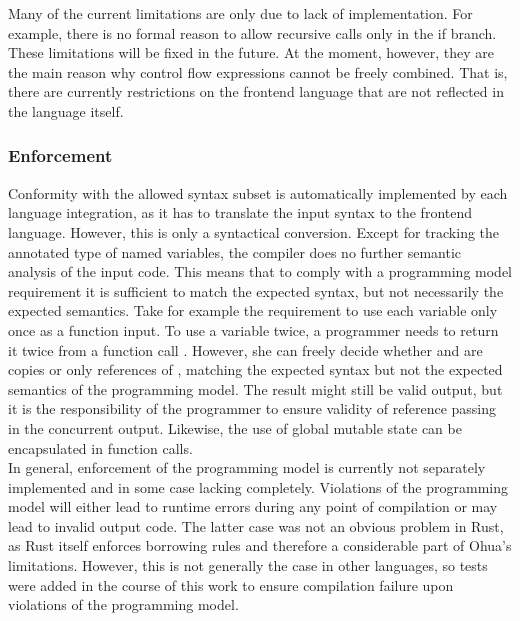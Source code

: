 Many of the current limitations are only due to lack of implementation. For example, there is no formal reason to allow recursive calls only in the if branch. These limitations will be fixed in the future. At the moment, however, they are the main reason why control flow expressions cannot be freely combined. That is, there are currently restrictions on the frontend language that are not reflected in the language itself.


\subsubsection{Enforcement}

Conformity with the allowed syntax subset is automatically implemented by each language integration, as it has to translate the input syntax to the frontend language. However, this is only a syntactical conversion. Except for tracking the annotated type of named variables, the compiler does no further semantic analysis of the input code. This means that to comply with a programming model requirement it is sufficient to match the expected syntax, but not necessarily the expected semantics. Take for example the requirement to use each variable only once as a function input. To use a variable  twice, a programmer needs to return it twice from a function call . However, she can freely decide whether  and  are copies or only references of , matching the expected syntax but not the expected semantics of the programming model. The result might still be valid output, but it is the responsibility of the programmer to ensure validity of reference passing in the concurrent output. Likewise, the use of global mutable state can be encapsulated in function calls. \\

In general, enforcement of the programming model is currently not separately implemented and in some case lacking completely. Violations of the programming model will either lead to runtime errors during any point of compilation or may lead to invalid output code. The latter case was not an obvious problem in Rust, as Rust itself enforces borrowing rules and therefore a considerable part of Ohua's limitations. However, this is not generally the case in other languages, so tests were added in the course of this work to ensure compilation failure upon violations of the programming model.


